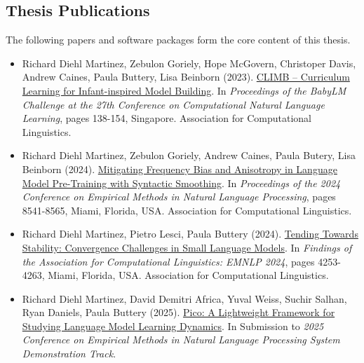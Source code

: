 \begin{tcolorbox}[
    enhanced,
    colback=white,
    colframe=thesisblue,
    arc=0mm,
    boxrule=1pt,
    left=10pt,
    right=10pt,
    top=10pt,
    bottom=10pt,
    title=Published Works,
    fonttitle=\bfseries,
    coltitle=white
]
\subsection*{Thesis Publications}
The following papers and software packages form the core content of this thesis.

\begin{itemize}
    \item Richard Diehl Martinez, Zebulon Goriely, Hope McGovern, Christoper Davis, Andrew Caines, Paula Buttery, Lisa Beinborn (2023). {\color{thesisblue}\href{https://aclanthology.org/2023.conll-1.10/}{CLIMB – Curriculum Learning for Infant-inspired Model Building}}. In \emph{Proceedings of the BabyLM Challenge at the 27th Conference on Computational Natural Language Learning}, pages 138-154, Singapore. Association for Computational Linguistics.

    \item Richard Diehl Martinez, Zebulon Goriely, Andrew Caines, Paula Butery, Lisa Beinborn (2024). {\color{thesisblue}\href{https://aclanthology.org/2024.emnlp-main.486/}{Mitigating Frequency Bias and Anisotropy in Language Model Pre-Training with Syntactic Smoothing}}. In \emph{Proceedings of the 2024 Conference on Empirical Methods in Natural Language Processing}, pages 8541-8565, Miami, Florida, USA. Association for Computational Linguistics.

    \item Richard Diehl Martinez, Pietro Lesci, Paula Buttery (2024). {\color{thesisblue}\href{https://aclanthology.org/2024.findings-emnlp.246/}{Tending Towards Stability: Convergence Challenges in Small Language Models}}. In \emph{Findings of the Association for Computational Linguistics: EMNLP 2024}, pages 4253-4263, Miami, Florida, USA. Association for Computational Linguistics.

    \item Richard Diehl Martinez, David Demitri Africa, Yuval Weiss, Suchir Salhan, Ryan Daniels, Paula Buttery (2025). {\color{thesisblue}\href{https://github.com/pico-lm}{Pico: A Lightweight Framework for Studying Language Model Learning Dynamics}}. In Submission to \emph{2025 Conference on Empirical Methods in Natural Language Processing System Demonstration Track}.
\end{itemize}
\end{tcolorbox}

